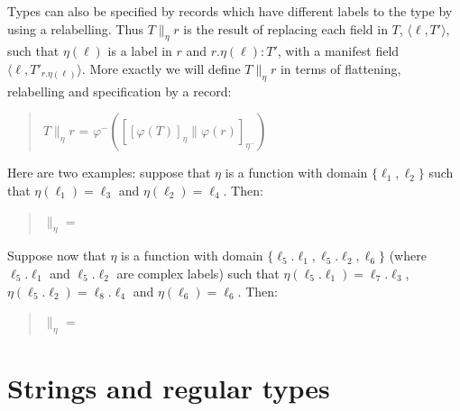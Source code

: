 Types can also be specified by records which have different labels to
the type by using a relabelling.  Thus $T\parallel_\eta r$ is the
result of replacing each field in $T$, $\langle\ell,T'\rangle$,  such
that $\eta(\ell)$ is a label in $r$ and $r.\eta(\ell):T'$, with a
manifest field$\langle\ell,T'_{r.\eta(\ell)}\rangle$.  More exactly we
will define $T\parallel_\eta r$ in terms of flattening, relabelling
and specification by a record:
\begin{quote}
$T\parallel_\eta r$ =
$\varphi^-([[\varphi(T)]_\eta\parallel\varphi(r)]_{\eta^-})$
\end{quote}
Here are two examples:  suppose that %
$\eta$ is a
function with domain $\{\ell_1,\ell_2\}$ such that
$\eta(\ell_1)=\ell_3$ and $\eta(\ell_2)=\ell_4$.  Then:
\begin{quote}
 $\parallel_\eta$ 
=
\end{quote}
Suppose now that %
$\eta$ is a
function with domain $\{\ell_5.\ell_1, \ell_5.\ell_2, \ell_6\}$ (where
$\ell_5.\ell_1$ and $\ell_5.\ell_2$ are complex labels) such that
$\eta(\ell_5.\ell_1)=\ell_7.\ell_3$,
$\eta(\ell_5.\ell_2)=\ell_8.\ell_4$ and $\eta(\ell_6)=\ell_6$.  Then:
\begin{quote}
 $\parallel_\eta$
 =
\begin{quote}
\end{quote}
\end{quote}  

\section{Strings and regular types}
\label{sec:regular}
\label{app:strings}

